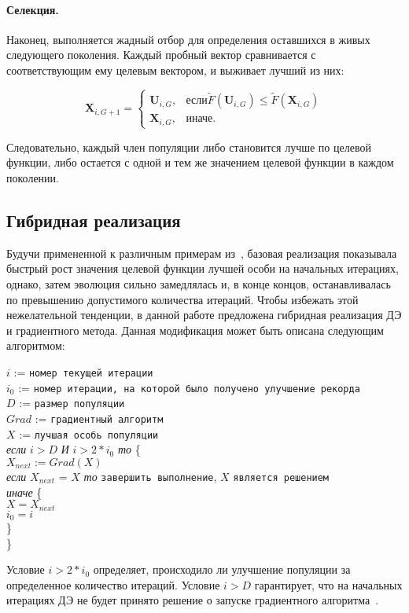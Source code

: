 \documentclass{llncs}
\begin{document}
\paragraph*{Селекция.}

Наконец, выполняется жадный отбор для определения оставшихся в живых следующего поколения. Каждый пробный вектор сравнивается с соответствующим ему целевым вектором, и выживает лучший из них:

\begin{equation}\label{eq:de_sel}
  \textbf{X}_{i,G+1} =
  \begin{cases}
    \textbf{U}_{i,G}, & \mbox{если} \tilde{F}(\textbf{U}_{i,G}) \leq \tilde{F}(\textbf{X}_{i,G}) \\
    \textbf{X}_{i,G}, & \mbox{иначе}.
  \end{cases}
\end{equation}

Следовательно, каждый член популяции либо становится лучше по целевой функции, либо остается с одной и тем же значением целевой функции в каждом поколении.

\subsection{Гибридная реализация}
Будучи примененной к различным примерам из~\cite{tyunin:daor}, базовая реализация показывала быстрый рост значения целевой функции лучшей особи на начальных итерациях, однако, затем эволюция сильно замедлялась и, в конце концов, останавливалась по превышению допустимого количества итераций. Чтобы избежать этой нежелательной тенденции, в данной работе предложена гибридная реализация ДЭ и градиентного метода. Данная модификация может быть описана следующим алгоритмом:

\begin{flushleft}
\small
$i$ := \verb"номер текущей итерации" \\
$i_0$ := \verb"номер итерации, на которой было получено улучшение рекорда"\\
$D$ := \verb"размер популяции"\\
$Grad$ := \verb"градиентный алгоритм"\\
$X$ := \verb"лучшая особь популяции"\\

\textit{если} $i > D$ \textit{И} $i > 2 * i_0$ \textit{то} \{\\
\leftskip=12pt
    $X_{next} := Grad(X)$\\
    \textit{если} $X_{next}$ = $X$ \textit{то} \verb"завершить выполнение", $X$ \verb"является решением"\\
    \textit{иначе} \{\\
    \leftskip=24pt
        $X = X_{next}$\\
        $i_0 = i$\\
        \leftskip=12pt
    \}\\
    \leftskip=0pt
\}
\end{flushleft}
Условие $i > 2 * i_0$ определяет, происходило ли улучшение популяции за определенное количество итераций. Условие $i > D$ гарантирует, что на начальных итерациях ДЭ не будет принято решение о запуске градиентного алгоритма~\cite{eremeev:restart}.
\end{document}
